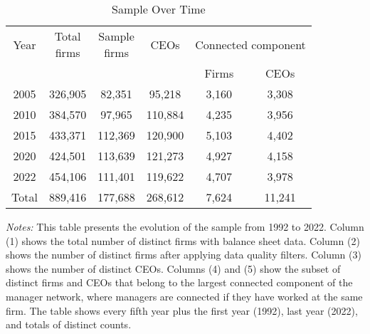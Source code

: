 \begin{table}[htbp]
\centering
\caption{Sample Over Time}
\label{tab:sample}
\begin{tabular}{*{6}{c}}
\toprule
Year & \shortstack{Total\\firms} & \shortstack{Sample\\firms} & CEOs & \multicolumn{2}{c}{Connected component} \\
\cmidrule(lr){5-6}
 & & & & Firms & CEOs \\
\midrule
2005 &      326,905 &       82,351 &       95,218 &        3,160 &        3,308 \\
2010 &      384,570 &       97,965 &      110,884 &        4,235 &        3,956 \\
2015 &      433,371 &      112,369 &      120,900 &        5,103 &        4,402 \\
2020 &      424,501 &      113,639 &      121,273 &        4,927 &        4,158 \\
2022 &      454,106 &      111,401 &      119,622 &        4,707 &        3,978 \\
\midrule
Total &      889,416 &      177,688 &      268,612 &        7,624 &       11,241 \\
\bottomrule
\end{tabular}
\begin{minipage}{12cm}
\footnotesize
\textit{Notes:} This table presents the evolution of the sample from 1992 to 2022. Column (1) shows the total number of distinct firms with balance sheet data. Column (2) shows the number of distinct firms after applying data quality filters. Column (3) shows the number of distinct CEOs. Columns (4) and (5) show the subset of distinct firms and CEOs that belong to the largest connected component of the manager network, where managers are connected if they have worked at the same firm. The table shows every fifth year plus the first year (1992), last year (2022), and totals of distinct counts. \end{minipage}
\end{table}
